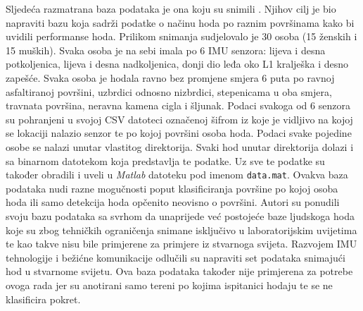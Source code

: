 \documentclass[times, utf8, diplomski]{fer}
\begin{document}
Sljedeća razmatrana baza podataka je ona koju su snimili \cite{uneven}. Njihov cilj je bio napraviti bazu koja sadrži podatke o
načinu hoda po raznim površinama kako bi uvidili performanse hoda. Prilikom snimanja sudjelovalo je 30 osoba (15 ženskih i
15 muških). Svaka osoba je na sebi imala po 6 IMU senzora: lijeva i desna potkoljenica, lijeva i desna nadkoljenica, donji dio leđa
oko L1 kralješka i desno zapešće. Svaka osoba je hodala ravno bez promjene smjera 6 puta po ravnoj asfaltiranoj površini, uzbrdici
odnosno nizbrdici, stepenicama u oba smjera, travnata površina, neravna kamena cigla i šljunak. Podaci svakoga od 6 senzora su
pohranjeni u svojoj CSV datoteci označenoj šifrom iz koje je vidljivo na kojoj se lokaciji nalazio senzor te po kojoj površini
osoba hoda. Podaci svake pojedine osobe se nalazi unutar vlastitog direktorija. Svaki hod unutar direktorija dolazi i sa binarnom
datotekom koja predstavlja te podatke. Uz sve te podatke \cite{uneven} su također obradili i uveli u \textit{Matlab} datoteku pod 
imenom \texttt{data.mat}. Ovakva baza podataka nudi razne mogučnosti poput klasificiranja površine po kojoj osoba hoda ili samo 
detekcija hoda opčenito neovisno o površini. Autori su ponudili svoju bazu podataka sa svrhom da unaprijede već postojeće baze
ljudskoga hoda koje su zbog tehničkih ograničenja snimane isključivo u laboratorijskim uvijetima te kao takve nisu bile primjerene
za primjere iz stvarnoga svijeta. Razvojem IMU tehnologije i bežićne komunikacije \cite{uneven} odlučili su napraviti set podataka
snimajući hod u stvarnome svijetu. Ova baza podataka također nije primjerena za potrebe ovoga rada jer su anotirani samo tereni
po kojima ispitanici hodaju te se ne klasificira pokret.
\end{document}
